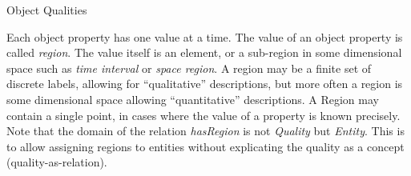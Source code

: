 \begin{ODP}{Object Qualities}
\end{ODP}

Each object property has one value at a time. The value of an object property is called \emph{region}.
The value itself is an element, or a sub-region in some dimensional
space such as \emph{time interval} or \emph{space region}.
A region may be a finite set of discrete labels, allowing for ``qualitative'' descriptions,
but more often a region is some dimensional space allowing ``quantitative'' descriptions.
A Region may contain a single point, in cases where the value of a property is known precisely.
Note that the domain of the relation \emph{hasRegion} is not \emph{Quality} but \emph{Entity}.
This is to allow assigning regions to entities without explicating the quality as a concept (quality-as-relation).

